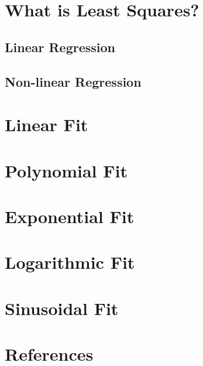 \documentclass[12pt, letterpaper]{article}
\begin{document}
	
	\section{What is Least Squares?}
		\subsection{Linear Regression}

		\subsection{Non-linear Regression}
	
	\section{Linear Fit} 
		
	\section{Polynomial Fit}
	
	\section{Exponential Fit}
	
	\section{Logarithmic Fit}
	
	\section{Sinusoidal Fit}
	
	\section{References}
	
	
\end{document}
